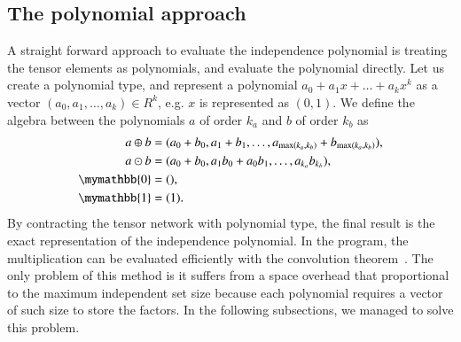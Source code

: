 \documentclass[review,onefignum,onetabnum]{siamart190516}
\newcommand{\<}{\langle}
\renewcommand{\>}{\rangle}
\begin{document}
\subsection{The polynomial approach}
A straight forward approach to evaluate the independence polynomial is treating the tensor elements as polynomials, and evaluate the polynomial directly.
Let us create a polynomial type, and represent a polynomial $a_0 + a_1 x + \ldots + a_k x^k$ as a vector $(a_0, a_1, \ldots, a_k) \in R^k$, e.g. $x$ is represented as $(0, 1)$.
We define the algebra between the polynomials $a$ of order $k_a$ and $b$ of order $k_b$ as
\begin{align}
    \begin{split}
    a \oplus b &= (a_0 + b_0, a_1 + b_1, \ldots, a_{\max(k_a, k_b)} + b_{\max(k_a, k_b)}),\\
    a \odot b &= (a_0 + b_0, a_1b_0 + a_0b_1, \ldots, a_{k_a} b_{k_b}),\\
    \mymathbb{0} &= (),\\
    \mymathbb{1} &= (1).\label{eq:polynomial}
    \end{split}
\end{align}
By contracting the tensor network with polynomial type, the final result is the exact representation of the independence polynomial.
In the program, the multiplication can be evaluated efficiently with the convolution theorem~\cite{Schonhage1971}.
The only problem of this method is it suffers from a space overhead that proportional to the maximum independent set size because each polynomial requires a vector of such size to store the factors.
In the following subsections, we managed to solve this problem.
\end{document}
